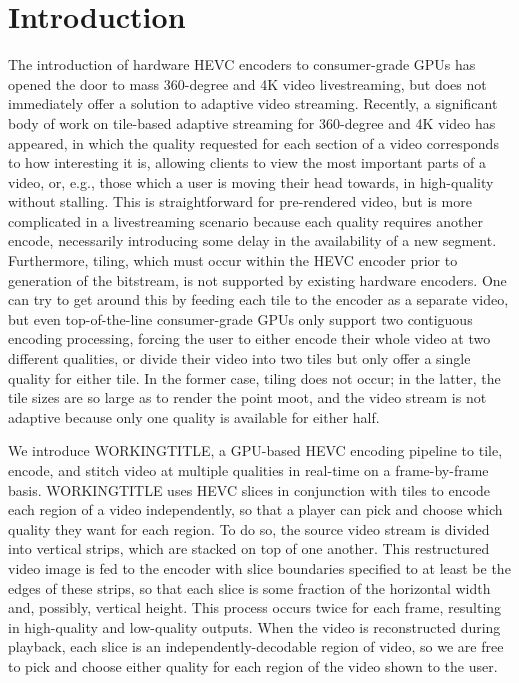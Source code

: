 \section{Introduction}
The introduction of hardware HEVC encoders to consumer-grade GPUs has opened the door to mass 360-degree and 4K video livestreaming, but does not immediately offer a solution to adaptive video streaming. Recently, a significant body of work on tile-based adaptive streaming for 360-degree and 4K video has appeared, in which the quality requested for each section of a video corresponds to how interesting it is, allowing clients to view the most important parts of a video, or, e.g., those which a user is moving their head towards, in high-quality without stalling. This is straightforward for pre-rendered video, but is more complicated in a livestreaming scenario because each quality requires another encode, necessarily introducing some delay in the availability of a new segment. Furthermore, tiling, which must occur within the HEVC encoder prior to generation of the bitstream, is not supported by existing hardware encoders. One can try to get around this by feeding each tile to the encoder as a separate video, but even top-of-the-line consumer-grade GPUs only support two contiguous encoding processing, forcing the user to either encode their whole video at two different qualities, or divide their video into two tiles but only offer a single quality for either tile. In the former case, tiling does not occur; in the latter, the tile sizes are so large as to render the point moot, and the video stream is not adaptive because only one quality is available for either half.

We introduce WORKINGTITLE, a GPU-based HEVC encoding pipeline to tile, encode, and stitch video at multiple qualities in real-time on a frame-by-frame basis. WORKINGTITLE uses HEVC slices in conjunction with tiles to encode each region of a video independently, so that a player can pick and choose which quality they want for each region. To do so, the source video stream is divided into vertical strips, which are stacked on top of one another. This restructured video image is fed to the encoder with slice boundaries specified to at least be the edges of these strips, so that each slice is some fraction of the horizontal width and, possibly, vertical height. This process occurs twice for each frame, resulting in high-quality and low-quality outputs. When the video is reconstructed during playback, each slice is an independently-decodable region of video, so we are free to pick and choose either quality for each region of the video shown to the user.

